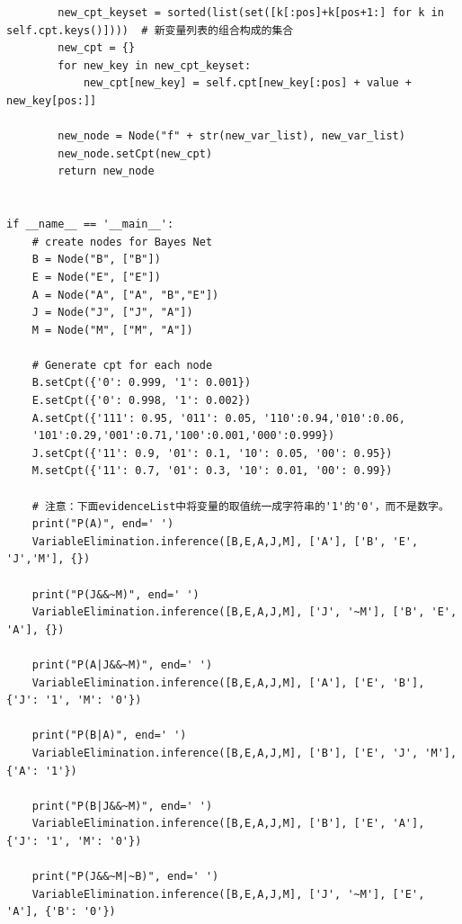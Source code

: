 \documentclass[a4paper, 11pt]{article}
\begin{document}
\begin{lstlisting}
        new_cpt_keyset = sorted(list(set([k[:pos]+k[pos+1:] for k in self.cpt.keys()])))  # 新变量列表的组合构成的集合
        new_cpt = {}
        for new_key in new_cpt_keyset:
            new_cpt[new_key] = self.cpt[new_key[:pos] + value + new_key[pos:]]

        new_node = Node("f" + str(new_var_list), new_var_list)
        new_node.setCpt(new_cpt)
        return new_node


if __name__ == '__main__':
    # create nodes for Bayes Net
    B = Node("B", ["B"])
    E = Node("E", ["E"])
    A = Node("A", ["A", "B","E"])
    J = Node("J", ["J", "A"])
    M = Node("M", ["M", "A"])

    # Generate cpt for each node
    B.setCpt({'0': 0.999, '1': 0.001})
    E.setCpt({'0': 0.998, '1': 0.002})
    A.setCpt({'111': 0.95, '011': 0.05, '110':0.94,'010':0.06,
    '101':0.29,'001':0.71,'100':0.001,'000':0.999})
    J.setCpt({'11': 0.9, '01': 0.1, '10': 0.05, '00': 0.95})
    M.setCpt({'11': 0.7, '01': 0.3, '10': 0.01, '00': 0.99})

    # 注意：下面evidenceList中将变量的取值统一成字符串的'1'的'0'，而不是数字。
    print("P(A)", end=' ')
    VariableElimination.inference([B,E,A,J,M], ['A'], ['B', 'E', 'J','M'], {})

    print("P(J&&~M)", end=' ')
    VariableElimination.inference([B,E,A,J,M], ['J', '~M'], ['B', 'E', 'A'], {})

    print("P(A|J&&~M)", end=' ')
    VariableElimination.inference([B,E,A,J,M], ['A'], ['E', 'B'], {'J': '1', 'M': '0'})

    print("P(B|A)", end=' ')
    VariableElimination.inference([B,E,A,J,M], ['B'], ['E', 'J', 'M'], {'A': '1'})

    print("P(B|J&&~M)", end=' ')
    VariableElimination.inference([B,E,A,J,M], ['B'], ['E', 'A'], {'J': '1', 'M': '0'})

    print("P(J&&~M|~B)", end=' ')
    VariableElimination.inference([B,E,A,J,M], ['J', '~M'], ['E', 'A'], {'B': '0'})
\end{lstlisting}
\end{document}
